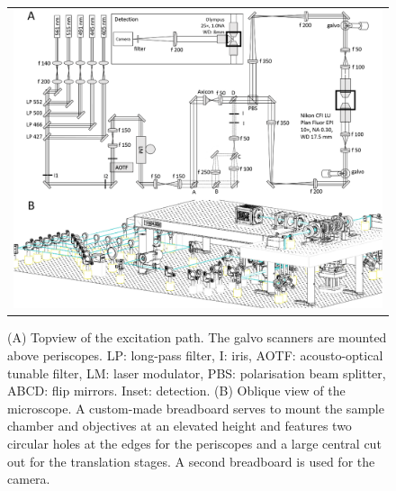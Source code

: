 \documentclass[12pt]{spieman}  %
\begin{document}
		\begin{figure}
   \begin{center}
   \begin{tabular}{c}
   \includegraphics[width=\textwidth]{Panel2.eps}
   \end{tabular}
   \end{center}
   \caption{\label{fig:excitation} (A) Topview of the excitation path. The galvo scanners are mounted above periscopes. LP: long-pass filter, I: iris, AOTF: acousto-optical tunable filter, LM: laser modulator, PBS: polarisation beam splitter, ABCD: flip mirrors. Inset: detection. (B) Oblique view of the microscope. A custom-made breadboard serves to mount the sample chamber and objectives at an elevated height and features two circular holes at the edges for the periscopes and a large central cut out for the translation stages. A second breadboard is used for the camera.} 
   \end{figure}
		
\end{document}
